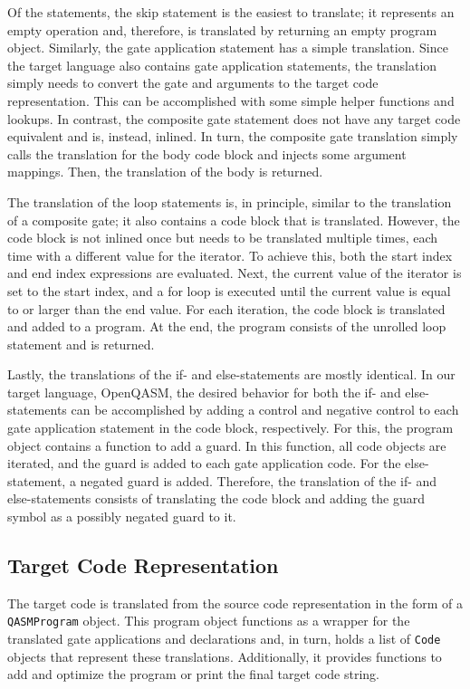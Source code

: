 Of the statements, the skip statement is the easiest to translate; it represents an empty operation and, therefore, is translated by returning an empty program object. Similarly, the gate application statement has a simple translation. Since the target language also contains gate application statements, the translation simply needs to convert the gate and arguments to the target code representation. This can be accomplished with some simple helper functions and lookups. In contrast, the composite gate statement does not have any target code equivalent and is, instead, inlined. In turn, the composite gate translation simply calls the translation for the body code block and injects some argument mappings. Then, the translation of the body is returned.

The translation of the loop statements is, in principle, similar to the translation of a composite gate; it also contains a code block that is translated. However, the code block is not inlined once but needs to be translated multiple times, each time with a different value for the iterator. To achieve this, both the start index and end index expressions are evaluated. Next, the current value of the iterator is set to the start index, and a for loop is executed until the current value is equal to or larger than the end value. For each iteration, the code block is translated and added to a program. At the end, the program consists of the unrolled loop statement and is returned. 

Lastly, the translations of the if- and else-statements are mostly identical. In our target language, OpenQASM, the desired behavior for both the if- and else-statements can be accomplished by adding a control and negative control to each gate application statement in the code block, respectively. For this, the program object contains a function to add a guard. In this function, all code objects are iterated, and the guard is added to each gate application code. For the else-statement, a negated guard is added. Therefore, the translation of the if- and else-statements consists of translating the code block and adding the guard symbol as a possibly negated guard to it. 

\subsection{Target Code Representation}
\label{sec:implementation_targetCode}
The target code is translated from the source code representation in the form of a \texttt{QASMProgram} object. This program object functions as a wrapper for the translated gate applications and declarations and, in turn, holds a list of \texttt{Code} objects that represent these translations. Additionally, it provides functions to add and optimize the program or print the final target code string. 

